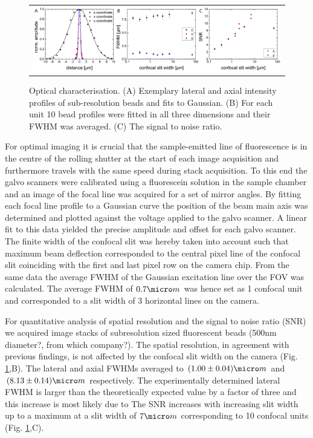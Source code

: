 \documentclass[12pt]{spieman}  %
\begin{document}
\begin{figure}
   \begin{center}
   \begin{tabular}{c}
   \includegraphics[width=\textwidth]{origin.eps}
   \end{tabular}
   \end{center}
   \caption{\label{fig:origin} Optical characterisation. (A) Exemplary lateral and axial intensity profiles of sub-resolution beads and fits to Gaussian. (B) For each unit 10 bead profiles were fitted in all three dimensions and their FWHM was averaged. (C) The signal to noise ratio.} 
\end{figure}

For optimal imaging it is crucial that the sample-emitted line of fluorescence is in the centre of the rolling shutter at the start of each image acquisition and furthermore travels with the same speed during stack acquisition. To this end the galvo scanners were calibrated using a fluorescein solution in the sample chamber and an image of the focal line was acquired for a set of mirror angles. By fitting each focal line profile to a Gaussian curve the position of the beam main axis was determined and plotted against the voltage applied to the galvo scanner. A linear fit to this data yielded the precise amplitude and offset for each galvo scanner. The finite width of the confocal slit was hereby taken into account such that maximum beam deflection corresponded to the central pixel line of the confocal slit coinciding with the first and last pixel row on the camera chip. From the same data the average FWHM of the Gaussian excitation line over the FOV was calculated. The average FWHM of $0.7\micro m$ was hence set as 1 confocal unit and corresponded to a slit width of 3 horizontal lines on the camera. 

For quantitative analysis of spatial resolution and the signal to noise ratio (SNR) we acquired image stacks of subresolution sized fluorescent beads (500nm diameter?, from which company?). The spatial resolution, in agreement with previous findings\cite{Wilson1987,Cox2004}, is not affected by the confocal slit width on the camera (Fig. \ref{fig:origin},B). The lateral and axial FWHMs averaged to $(1.00\pm0.04) \micro m$ and $(8.13\pm0.14) \micro m$ respectively. The experimentally determined lateral FWHM is larger than the theoretically expected value by a factor of three and this increase is most likely due to The SNR increases with increasing slit width up to a maximum at a slit width of $7 \micro m$ corresponding to 10 confocal units (Fig. \ref{fig:origin},C).   
\end{document}
